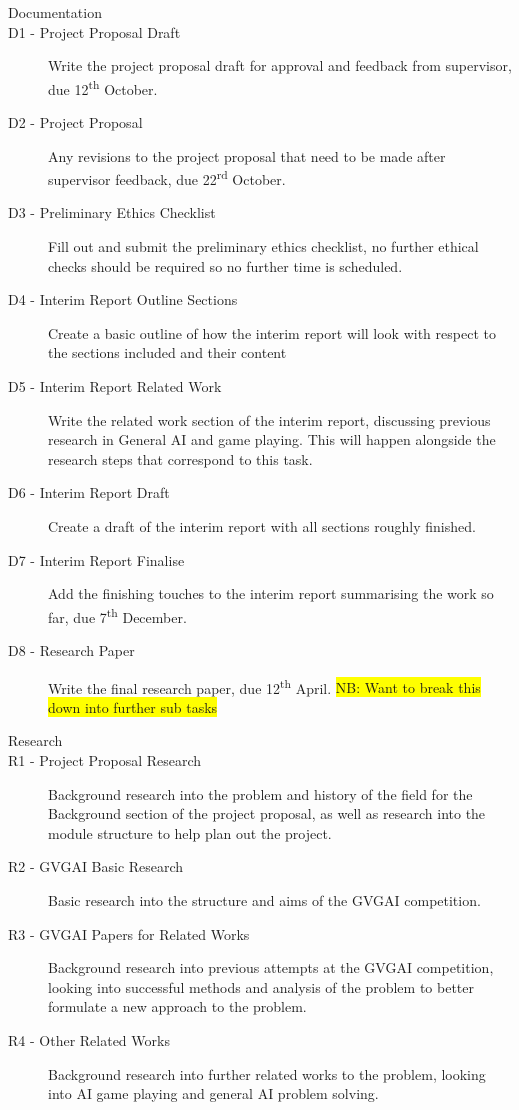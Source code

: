 \documentclass[a4paper]{article}
\begin{document}
\begin{description}
\item [\large{Documentation}]
\item [D1 - Project Proposal Draft]
Write the project proposal draft for approval and feedback from supervisor, due 12\textsuperscript{th} October.
\item [D2 - Project Proposal]
Any revisions to the project proposal that need to be made after supervisor feedback, due 22\textsuperscript{rd} October.
\item [D3 - Preliminary Ethics Checklist]
Fill out and submit the preliminary ethics checklist, no further ethical checks should be required so no further time is scheduled.
\item [D4 - Interim Report Outline Sections]
Create a basic outline of how the interim report will look with respect to the sections included and their content
\item [D5 - Interim Report Related Work]
Write the related work section of the interim report, discussing previous research in General AI and game playing. This will happen alongside the research steps that correspond to this task.
\item [D6 - Interim Report Draft]
Create a draft of the interim report with all sections roughly finished.
\item [D7 - Interim Report Finalise]
Add the finishing touches to the interim report summarising the work so far, due 7\textsuperscript{th} December.
\item [D8 - Research Paper]
Write the final research paper, due 12\textsuperscript{th} April.
\colorbox{yellow}{NB: Want to break this down into further sub tasks}

\item [\large{Research}]
\item [R1 - Project Proposal Research]
Background research into the problem and history of the field for the Background section of the project proposal, as well as research into the module structure to help plan out the project.
\item [R2 - GVGAI Basic Research]
Basic research into the structure and aims of the GVGAI competition.
\item [R3 - GVGAI Papers for Related Works]
Background research into previous attempts at the GVGAI competition, looking into successful methods and analysis of the problem to better formulate a new approach to the problem.
\item [R4 - Other Related Works]
Background research into further related works to the problem, looking into AI game playing and general AI problem solving.


\end{description}
\end{document}
